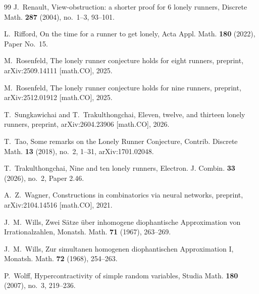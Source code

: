 \documentclass[11pt,reqno]{amsart}
\numberwithin{equation}{section}
\theoremstyle{definition}
\theoremstyle{remark}
\begin{document}
\begin{thebibliography}{99}
J.~Renault,
\newblock View-obstruction: a shorter proof for 6 lonely runners,
\newblock Discrete Math. \textbf{287} (2004), no.~1--3, 93--101.

L.~Rifford,
\newblock On the time for a runner to get lonely,
\newblock Acta Appl. Math. \textbf{180} (2022), Paper No.~15.

M.~Rosenfeld,
\newblock The lonely runner conjecture holds for eight runners,
\newblock preprint, arXiv:2509.14111 [math.CO], 2025.

M.~Rosenfeld,
\newblock The lonely runner conjecture holds for nine runners,
\newblock preprint, arXiv:2512.01912 [math.CO], 2025.

T.~Sungkawichai and T.~Trakulthongchai,
\newblock Eleven, twelve, and thirteen lonely runners,
\newblock preprint, arXiv:2604.23906 [math.CO], 2026.

T.~Tao,
\newblock Some remarks on the Lonely Runner Conjecture,
\newblock Contrib. Discrete Math. \textbf{13} (2018), no.~2, 1--31,
\newblock arXiv:1701.02048.

T.~Trakulthongchai,
\newblock Nine and ten lonely runners,
\newblock Electron. J. Combin. \textbf{33} (2026), no.~2, Paper 2.46.

A.~Z.~Wagner,
\newblock Constructions in combinatorics via neural networks,
\newblock preprint, arXiv:2104.14516 [math.CO], 2021.

J.~M.~Wills,
\newblock Zwei S\"atze \"uber inhomogene diophantische Approximation von Irrationalzahlen,
\newblock Monatsh. Math. \textbf{71} (1967), 263--269.

J.~M.~Wills,
\newblock Zur simultanen homogenen diophantischen Approximation I,
\newblock Monatsh. Math. \textbf{72} (1968), 254--263.

P.~Wolff,
\newblock Hypercontractivity of simple random variables,
\newblock Studia Math. \textbf{180} (2007), no.~3, 219--236.

\end{thebibliography}
\end{document}
